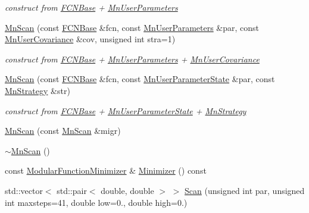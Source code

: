 \begin{DoxyCompactItemize}
\begin{DoxyCompactList}\small\item\em construct from \mbox{\hyperlink{classROOT_1_1Minuit2_1_1FCNBase}{F\+C\+N\+Base}} + \mbox{\hyperlink{classROOT_1_1Minuit2_1_1MnUserParameters}{Mn\+User\+Parameters}} \end{DoxyCompactList}\item 
\mbox{\hyperlink{classROOT_1_1Minuit2_1_1MnScan_a0152e76b39c1aa0c13dc8ed389f8d2cf}{Mn\+Scan}} (const \mbox{\hyperlink{classROOT_1_1Minuit2_1_1FCNBase}{F\+C\+N\+Base}} \&fcn, const \mbox{\hyperlink{classROOT_1_1Minuit2_1_1MnUserParameters}{Mn\+User\+Parameters}} \&par, const \mbox{\hyperlink{classROOT_1_1Minuit2_1_1MnUserCovariance}{Mn\+User\+Covariance}} \&cov, unsigned int stra=1)
\begin{DoxyCompactList}\small\item\em construct from \mbox{\hyperlink{classROOT_1_1Minuit2_1_1FCNBase}{F\+C\+N\+Base}} + \mbox{\hyperlink{classROOT_1_1Minuit2_1_1MnUserParameters}{Mn\+User\+Parameters}} + \mbox{\hyperlink{classROOT_1_1Minuit2_1_1MnUserCovariance}{Mn\+User\+Covariance}} \end{DoxyCompactList}\item 
\mbox{\hyperlink{classROOT_1_1Minuit2_1_1MnScan_a19bfbbf98648f6ad165a18279cc3e19b}{Mn\+Scan}} (const \mbox{\hyperlink{classROOT_1_1Minuit2_1_1FCNBase}{F\+C\+N\+Base}} \&fcn, const \mbox{\hyperlink{classROOT_1_1Minuit2_1_1MnUserParameterState}{Mn\+User\+Parameter\+State}} \&par, const \mbox{\hyperlink{classROOT_1_1Minuit2_1_1MnStrategy}{Mn\+Strategy}} \&str)
\begin{DoxyCompactList}\small\item\em construct from \mbox{\hyperlink{classROOT_1_1Minuit2_1_1FCNBase}{F\+C\+N\+Base}} + \mbox{\hyperlink{classROOT_1_1Minuit2_1_1MnUserParameterState}{Mn\+User\+Parameter\+State}} + \mbox{\hyperlink{classROOT_1_1Minuit2_1_1MnStrategy}{Mn\+Strategy}} \end{DoxyCompactList}\item 
\mbox{\hyperlink{classROOT_1_1Minuit2_1_1MnScan_ab4e017c0919d43eaa2f19e5c5a1a9f9a}{Mn\+Scan}} (const \mbox{\hyperlink{classROOT_1_1Minuit2_1_1MnScan}{Mn\+Scan}} \&migr)
\item 
\mbox{\hyperlink{classROOT_1_1Minuit2_1_1MnScan_ab51a420d238808cf195aafb0c0e29269}{$\sim$\+Mn\+Scan}} ()
\item 
const \mbox{\hyperlink{classROOT_1_1Minuit2_1_1ModularFunctionMinimizer}{Modular\+Function\+Minimizer}} \& \mbox{\hyperlink{classROOT_1_1Minuit2_1_1MnScan_a9bebaf56360ff70aac6f47590227d8b5}{Minimizer}} () const
\item 
std\+::vector$<$ std\+::pair$<$ double, double $>$ $>$ \mbox{\hyperlink{classROOT_1_1Minuit2_1_1MnScan_aaad559ec656a90df6e3283885ff2e7ca}{Scan}} (unsigned int par, unsigned int maxsteps=41, double low=0., double high=0.)
\end{DoxyCompactItemize}
